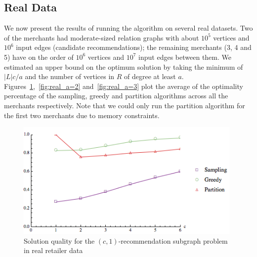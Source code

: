 \subsection{Real Data}
We now present the results of running the algorithm on several real
datasets. Two of the merchants had moderate-sized relation graphs with
about $10^5$ vertices and $10^6$ input edges (candidate
recommendations); the remaining merchants (3, 4 and 5) have on the
order of $10^6$ vertices and $10^7$ input edges between them. 
We estimated an upper bound on the optimum solution by taking the minimum of
$|L|c/a$ and the number of vertices in $R$ of degree at least
$a$. Figures~\ref{fig:real_a=1},~\ref{fig:real_a=2}
and~\ref{fig:real_a=3} plot the average of the optimality
percentage of the sampling, greedy and partition algorithms across all
the merchants respectively. Note that we could only run the partition
algorithm for the first two merchants due to memory constraints. \vs

\begin{figure}[t]
\centering
\begin{minipage}[h]{0.48\textwidth}
\centering
\includegraphics[width=0.98\textwidth]{images/real_a=1.png}
\caption{Solution quality for the $(c, 1)$-recommendation subgraph problem in real retailer data }\label{fig:real_a=1}
\end{minipage}
\end{figure}

